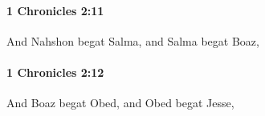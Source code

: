 		\paragraph{1 Chronicles 2:11} %
			\label{1CHRONICLES-2-11}

			And Nahshon begat Salma, and Salma begat Boaz,


		\paragraph{1 Chronicles 2:12} %
			\label{1CHRONICLES-2-12}

			And Boaz begat Obed, and Obed begat Jesse,


